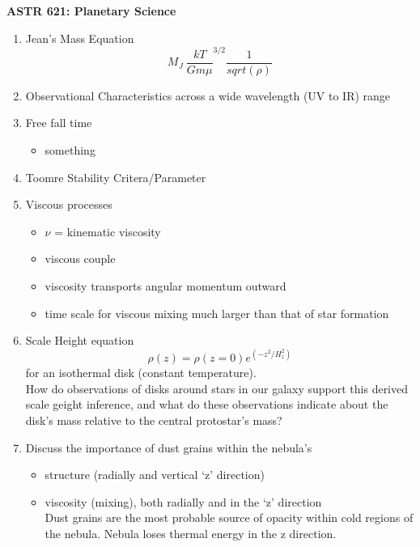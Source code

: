 \documentclass[12pt]{article}
\begin{document}
\textbf{ASTR 621: Planetary Science}

\begin{enumerate}%
\item Jean's Mass Equation 
  \begin{equation}
    M_J ~ \frac{kT}{Gm\mu}^{3/2}\frac{1}{sqrt(\rho)}
  \end{equation}

\item Observational Characteristics across a wide wavelength 
(UV to IR) range
\item Free fall time
\begin{itemize}
  \item something  
\end{itemize}
\item Toomre Stability Critera/Parameter
\item Viscous processes
\begin{itemize}
  \item $\nu$ = kinematic viscosity  
  \item viscous couple
  \item viscosity transports angular momentum outward
  \item time scale for viscous mixing much larger than that of star
  formation
\end{itemize}

\item Scale Height equation
  \begin{equation}
    \rho(z) = \rho(z=0)e^{(-z^2/H^2_z)}
  \end{equation}
  for an isothermal disk (constant temperature). \\
  How do observations of disks around stars in our galaxy support this
  derived scale geight inference, and what do these observations
  indicate about the disk's mass relative to the central protostar's
  mass?
\item Discuss the importance of dust grains within the nebula's
\begin{itemize}
  \item structure (radially and vertical `z' direction) \\
  \item viscosity (mixing), both radially and in the `z' direction \\
  Dust grains are the most probable source of opacity within cold
  regions of the nebula. Nebula loses thermal energy in the z
  direction. 


\end{itemize}
\end{enumerate}
\end{document}
